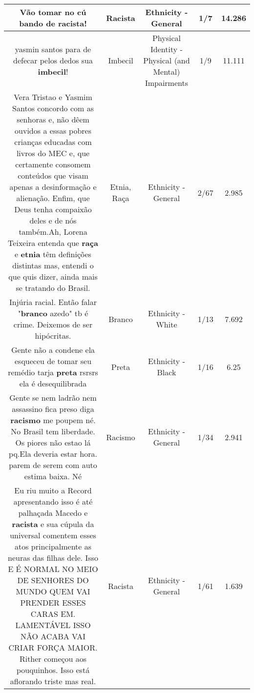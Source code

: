 \documentclass[11pt]{article}
\newlength\mylength
\begin{document}
\begin{center}
\begin{longtable}{|C{.65\mylength}|C{.30\mylength}|C{.12\mylength}|C{.12\mylength}|C{.12\mylength}|}
  \small Vão tomar no cú bando de \textbf{racista}!\normalsize   & Racista & Ethnicity - General & 1/7 & 14.286 \\  \hline
  \small yasmin santos para de defecar pelos dedos sua \textbf{imbecil}!\normalsize   & Imbecil & Physical Identity - Physical (and Mental) Impairments & 1/9 & 11.111 \\  \hline
  \small Vera Tristao e Yasmim Santos concordo com as senhoras e, não dêem ouvidos a essas pobres crianças educadas com livros do MEC e, que certamente consomem conteúdos que visam apenas a desinformação e alienação. Enfim, que Deus tenha compaixão deles e de nós também.Ah, Lorena Teixeira entenda que \textbf{raça} e \textbf{etnia} têm definições distintas mas, entendi o que quis dizer, ainda mais se tratando do Brasil.\normalsize   & Etnia, Raça & Ethnicity - General & 2/67 & 2.985 \\  \hline
  \small Injúria racial. Então falar "\textbf{branco} azedo" tb é crime. Deixemos de ser hipócritas.\normalsize   & Branco & Ethnicity - White & 1/13 & 7.692 \\  \hline
  \small Gente não a condene ela esqueceu de tomar seu remédio tarja \textbf{preta} rsrsrs ela é desequilibrada\normalsize   & Preta & Ethnicity - Black & 1/16 & 6.25 \\  \hline
  \small Gente se nem ladrão nem assassino fica preso diga \textbf{racismo} me poupem né. No Brasil tem liberdade. Os piores não estao lá pq.Ela deveria estar hora. parem de serem com auto estima baixa. Né\normalsize   & Racismo & Ethnicity - General & 1/34 & 2.941 \\  \hline
  \small Eu riu muito a Record apresentando isso é até palhaçada Macedo e \textbf{racista} e sua cúpula da universal comentem esses atos principalmente as neuras das filhas dele. Isso E É NORMAL NO MEIO DE SENHORES DO MUNDO QUEM VAI PRENDER ESSES CARAS EM. LAMENTÁVEL ISSO NÃO ACABA VAI CRIAR FORÇA MAIOR. Rither começou aos pouquinhos. Isso está aflorando triste mas real.\normalsize   & Racista & Ethnicity - General & 1/61 & 1.639 \\  \hline

\end{longtable}
\end{center}
\end{document}

